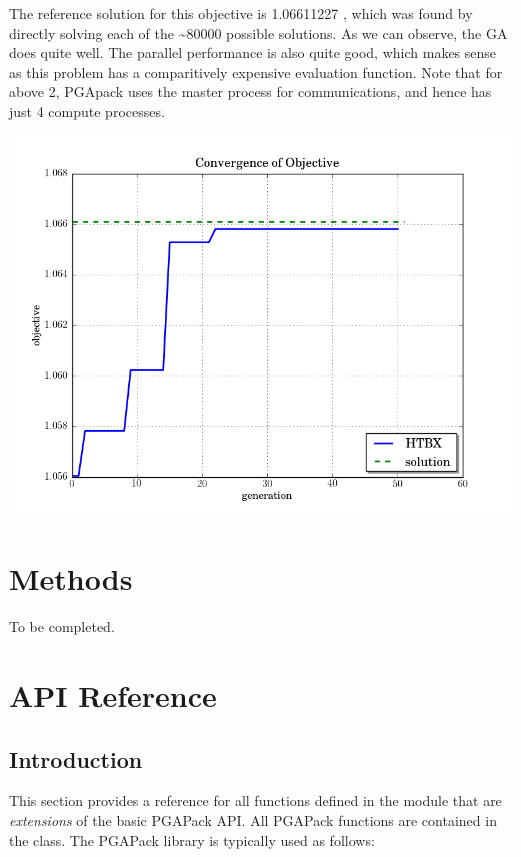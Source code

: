 \documentclass[letterpaper,11pt,english]{sphinxmanual}
\begin{document}
The reference solution for this objective is 1.06611227
, which was found by directly solving each
of the \textasciitilde{}80000 possible solutions.  As we can observe, the GA
does quite well.  The parallel performance is also quite good,
which makes sense as this problem has a comparitively expensive
evaluation function.  Note that for  above 2, PGApack
uses the master process for communications, and hence 
has just 4 compute processes.

\includegraphics{slab.png}


\chapter{Methods}
\label{methods:sec-methods}\label{methods::doc}\label{methods:methods}
To be completed.


\chapter{API Reference}
\label{api_reference:api-reference}\label{api_reference:sec-reference}\label{api_reference::doc}

\section{Introduction}
\label{api_reference:introduction}
This section provides a reference for all functions
defined in the  module that are \emph{extensions} of the basic
PGAPack API.  All PGAPack functions are contained in the
 class.  The PGAPack library is typically
used as follows:
\end{document}

